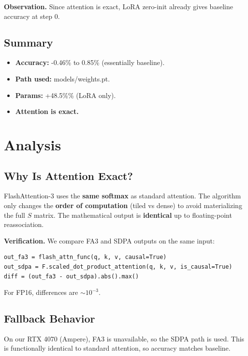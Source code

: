 \textbf{Observation.} Since attention is exact, LoRA zero-init already gives 
baseline accuracy at step 0.

\subsection{Summary}

\begin{itemize}
\item \textbf{Accuracy:} -0.46\% to 0.85\% (essentially baseline).
\item \textbf{Path used:} models/weights.pt.
\item \textbf{Params:} +48.5\%\% (LoRA only).
\item \textbf{Attention is exact.}

\end{itemize}


\section{Analysis}

\subsection{Why Is Attention Exact?}

FlashAttention-3 uses the \textbf{same softmax} as standard attention. The 
algorithm only changes the \textbf{order of computation} (tiled vs dense) to 
avoid materializing the full $S$ matrix. The mathematical output is 
\textbf{identical} up to floating-point reassociation.

\textbf{Verification.} We compare FA3 and SDPA outputs on the same input:

\begin{lstlisting}
out_fa3 = flash_attn_func(q, k, v, causal=True)
out_sdpa = F.scaled_dot_product_attention(q, k, v, is_causal=True)
diff = (out_fa3 - out_sdpa).abs().max()
\end{lstlisting}

For FP16, differences are $\sim 10^{-3}$.

\subsection{Fallback Behavior}

On our RTX 4070 (Ampere), FA3 is unavailable, so the SDPA path is used. 
This is functionally identical to standard attention, so accuracy matches 
baseline.

